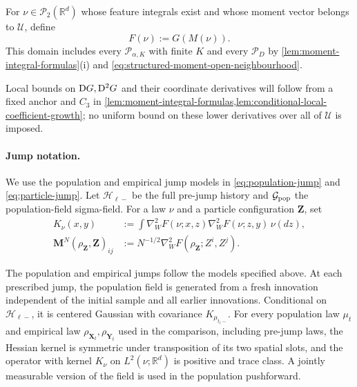 \begin{definition}
\label{def:moment-objective}
For $\nu\in\mathcal P_2(\mathbb R^d)$ whose feature integrals exist and
whose moment vector belongs to $\mathcal U$, define
\begin{equation}
\label{eq:moment-objective}
 F(\nu):=G(M(\nu)).
\end{equation}
This domain includes every $\mathcal P_{\alpha,K}$ with finite $K$ and
every $\mathcal P_D$ by \cref{lem:moment-integral-formulas}(i) and
\eqref{eq:structured-moment-open-neighbourhood}.
\end{definition}
Local bounds on $\mathrm{D} G,\mathrm{D}^2G$ and their coordinate derivatives will
follow from a fixed anchor and $C_3$ in
\cref{lem:moment-integral-formulas,lem:conditional-local-coefficient-growth};
no uniform bound on these lower derivatives over all of $\mathcal U$
is imposed.

\paragraph{Jump notation.}
We use the population and empirical jump models in
\eqref{eq:population-jump} and \eqref{eq:particle-jump}.
Let $\mathcal H_{\ell-}$ be the full pre-jump history and
$\mathcal G_{\rm pop}$ the population-field sigma-field. For a law $\nu$
and a particle configuration $\mathbf Z$, set
\begin{align*}
 K_\nu(x,y)&:=\int\nabla_W^2F(\nu;x,z)\nabla_W^2F(\nu;z,y)\,\nu(dz),\\
 \mathbf M^N(\rho_{\mathbf Z},\mathbf Z)_{ij}
 &:=N^{-1/2}\nabla_W^2F(\rho_{\mathbf Z};Z^i,Z^j).
\end{align*}
\begin{assumption}
\label{assumption-common-seed}
The population and empirical jumps follow the models specified above.
At each prescribed jump, the population field is generated from a fresh
innovation independent of the initial sample and all earlier innovations.
Conditional on $\mathcal H_{\ell-}$, it is centered Gaussian with covariance
$K_{\mu_{t_\ell-}}$. For every population law $\mu_t$ and empirical law
$\rho_{\mathbf X_t},\rho_{\mathbf Y_t}$ used in the comparison,
including pre-jump laws, the Hessian kernel is symmetric under transposition
of its two spatial slots, and the operator with kernel $K_\nu$ on
$L^2(\nu;\mathbb R^d)$ is positive and trace class.
A jointly measurable version of the field is used in the population pushforward.
\end{assumption}

